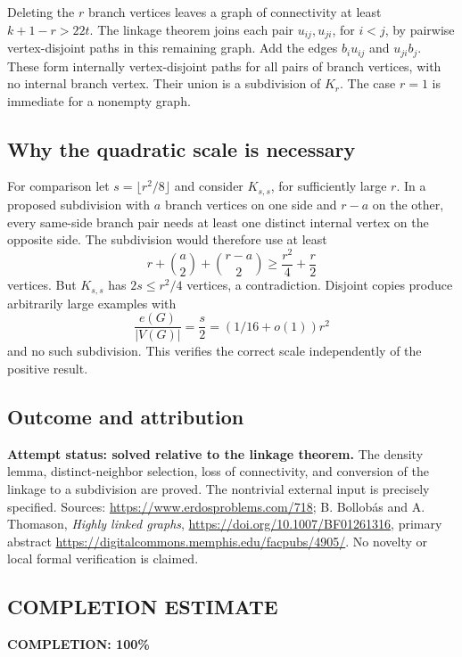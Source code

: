 Deleting the $r$ branch vertices leaves a graph of connectivity at least $k+1-r>22t$. The linkage theorem joins each pair $u_{ij},u_{ji}$, for $i<j$, by pairwise vertex-disjoint paths in this remaining graph. Add the edges $b_i u_{ij}$ and $u_{ji}b_j$. These form internally vertex-disjoint paths for all pairs of branch vertices, with no internal branch vertex. Their union is a subdivision of $K_r$. The case $r=1$ is immediate for a nonempty graph.

\subsection*{Why the quadratic scale is necessary}
For comparison let $s=\lfloor r^2/8\rfloor$ and consider $K_{s,s}$, for sufficiently large $r$. In a proposed subdivision with $a$ branch vertices on one side and $r-a$ on the other, every same-side branch pair needs at least one distinct internal vertex on the opposite side. The subdivision would therefore use at least
\[
 r+\binom a2+\binom{r-a}2
 \geq \frac{r^2}{4}+\frac r2
\]
vertices. But $K_{s,s}$ has $2s\leq r^2/4$ vertices, a contradiction. Disjoint copies produce arbitrarily large examples with
\[
 \frac{e(G)}{|V(G)|}=\frac s2=(1/16+o(1))r^2
\]
and no such subdivision. This verifies the correct scale independently of the positive result.

\subsection*{Outcome and attribution}
\textbf{Attempt status: solved relative to the linkage theorem.} The density lemma, distinct-neighbor selection, loss of connectivity, and conversion of the linkage to a subdivision are proved. The nontrivial external input is precisely specified.
Sources: \url{https://www.erdosproblems.com/718}; B. Bollob\'as and A. Thomason, \emph{Highly linked graphs}, \url{https://doi.org/10.1007/BF01261316}, primary abstract \url{https://digitalcommons.memphis.edu/facpubs/4905/}. No novelty or local formal verification is claimed.

\subsection*{COMPLETION ESTIMATE}
\textbf{COMPLETION: 100\%}
